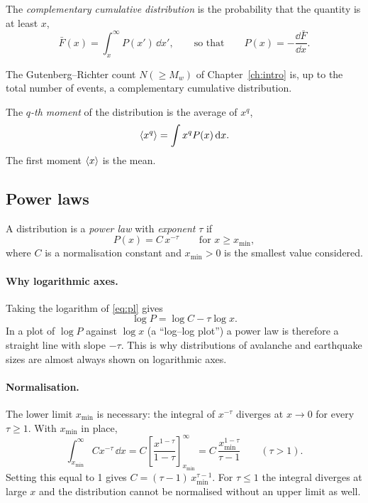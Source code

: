 \begin{definition}
The \emph{complementary cumulative distribution} is the probability that the quantity is at
least $x$,
\begin{equation}
  \bar F(x) = \int_x^\infty P(x')\,\dd x' , \qquad\text{so that}\qquad P(x) = -\frac{\dd \bar F}{\dd x}.
  \label{eq:Fbar}
\end{equation}
\end{definition}
The Gutenberg--Richter count $N(\geq M_w)$ of Chapter~\ref{ch:intro} is, up to the total number of
events, a complementary cumulative distribution.

\begin{definition}
The \emph{$q$-th moment} of the distribution is the average of $x^q$,
\begin{equation}
  \left\langle x^q \right\rangle = \int x^q P(x)\,\mathrm{d} x .
\end{equation}
The first moment $\left\langle x \right\rangle$ is the mean.
\end{definition}

\subsection{Power laws}

\begin{definition}
A distribution is a \emph{power law} with \emph{exponent} $\tau$ if
\begin{equation}
  P(x) = C\, x^{-\tau}\qquad\text{for } x \ge x_{\min},
  \label{eq:pl}
\end{equation}
where $C$ is a normalisation constant and $x_{\min}>0$ is the smallest value considered.
\end{definition}

\paragraph{Why logarithmic axes.} Taking the logarithm of \cref{eq:pl} gives
\begin{equation}
  \log P = \log C - \tau \log x .
\end{equation}
In a plot of $\log P$ against $\log x$ (a ``log--log plot'') a power law is therefore a straight
line with slope $-\tau$. This is why distributions of avalanche and earthquake sizes are almost
always shown on logarithmic axes.

\paragraph{Normalisation.} The lower limit $x_{\min}$ is necessary: the integral of $x^{-\tau}$
diverges at $x\to0$ for every $\tau\ge1$. With $x_{\min}$ in place,
\begin{equation}
  \int_{x_{\min}}^{\infty} C x^{-\tau}\,\dd x
  = C \left[\frac{x^{1-\tau}}{1-\tau}\right]_{x_{\min}}^{\infty}
  = C\,\frac{x_{\min}^{1-\tau}}{\tau-1}\qquad(\tau>1).
\end{equation}
Setting this equal to 1 gives $C = (\tau-1)\,x_{\min}^{\tau-1}$. For $\tau\le1$ the integral diverges
at large $x$ and the distribution cannot be normalised without an upper limit as well.

